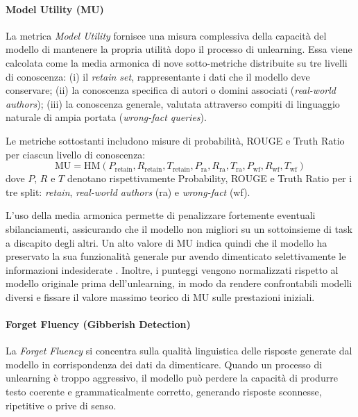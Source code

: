 \paragraph{Model Utility (MU)}

La metrica \textit{Model Utility} fornisce una misura complessiva della capacità del modello di mantenere la propria utilità dopo il processo di unlearning.  
Essa viene calcolata come la media armonica di nove sotto-metriche distribuite su tre livelli di conoscenza:  
(i) il \textit{retain set}, rappresentante i dati che il modello deve conservare;  
(ii) la conoscenza specifica di autori o domini associati (\textit{real-world authors});  
(iii) la conoscenza generale, valutata attraverso compiti di linguaggio naturale di ampia portata (\textit{wrong-fact queries}).

Le metriche sottostanti includono misure di probabilità, ROUGE e Truth Ratio per ciascun livello di conoscenza:
\[
\text{MU} = \text{HM}(P_{\text{retain}}, R_{\text{retain}}, T_{\text{retain}}, P_{\text{ra}}, R_{\text{ra}}, T_{\text{ra}}, P_{\text{wf}}, R_{\text{wf}}, T_{\text{wf}})
\]
dove \( P \), \( R \) e \( T \) denotano rispettivamente Probability, ROUGE e Truth Ratio per i tre split: \textit{retain}, \textit{real-world authors} (ra) e \textit{wrong-fact} (wf).

L'uso della media armonica permette di penalizzare fortemente eventuali sbilanciamenti, assicurando che il modello non migliori su un sottoinsieme di task a discapito degli altri.  
Un alto valore di MU indica quindi che il modello ha preservato la sua funzionalità generale pur avendo dimenticato selettivamente le informazioni indesiderate \cite{maini2024tofu}.  
Inoltre, i punteggi vengono normalizzati rispetto al modello originale prima dell'unlearning, in modo da rendere confrontabili modelli diversi e fissare il valore massimo teorico di MU sulle prestazioni iniziali.

\paragraph{Forget Fluency (Gibberish Detection)}

La \textit{Forget Fluency} si concentra sulla qualità linguistica delle risposte generate dal modello in corrispondenza dei dati da dimenticare.  
Quando un processo di unlearning è troppo aggressivo, il modello può perdere la capacità di produrre testo coerente e grammaticalmente corretto, generando risposte sconnesse, ripetitive o prive di senso.

